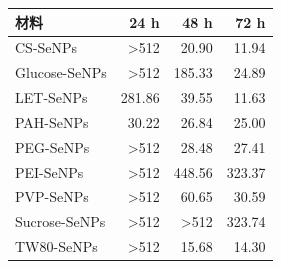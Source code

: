 \begin{tabular}{lrrr}
\toprule
材料 & 24 h & 48 h & 72 h \\
\midrule
CS-SeNPs & >512 & 20.90 & 11.94 \\
Glucose-SeNPs & >512 & 185.33 & 24.89 \\
LET-SeNPs & 281.86 & 39.55 & 11.63 \\
PAH-SeNPs & 30.22 & 26.84 & 25.00 \\
PEG-SeNPs & >512 & 28.48 & 27.41 \\
PEI-SeNPs & >512 & 448.56 & 323.37 \\
PVP-SeNPs & >512 & 60.65 & 30.59 \\
Sucrose-SeNPs & >512 & >512 & 323.74 \\
TW80-SeNPs & >512 & 15.68 & 14.30 \\
\bottomrule
\end{tabular}

